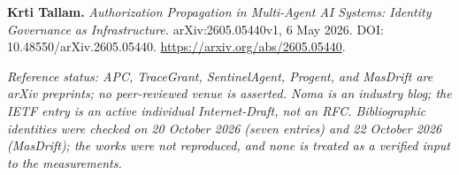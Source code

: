 \documentclass[
  10pt,
]{article}
\newcounter{none} %
\renewcommand{\_}{\origunderscore\allowbreak}
\begin{document}
\textbf{Krti Tallam.} \emph{Authorization Propagation in Multi-Agent AI
Systems: Identity Governance as Infrastructure.} arXiv:2605.05440v1, 6
May 2026. DOI: 10.48550/arXiv.2605.05440.
\url{https://arxiv.org/abs/2605.05440}.

\emph{Reference status: APC, TraceGrant, SentinelAgent, Progent, and
MasDrift are arXiv preprints; no peer-reviewed venue is asserted. Noma
is an industry blog; the IETF entry is an active individual
Internet-Draft, not an RFC. Bibliographic identities were checked on 20
October 2026 (seven entries) and 22 October 2026 (MasDrift); the works
were not reproduced, and none is treated as a verified input to the
measurements.}
\end{document}
